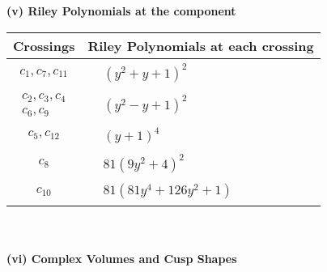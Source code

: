 \documentclass[1p]{elsarticle_modified}
\theoremstyle{definition}
\begin{document}
\newpage\renewcommand{\arraystretch}{1}
\flushleft \textbf{(v) Riley Polynomials at the component}\newline \\
\begin{tabular}{m{50pt}|m{274pt}}
Crossings & \hspace{64pt}Riley Polynomials at each crossing \\
\hline $$\begin{aligned}c_{1},c_{7},c_{11}\end{aligned}$$&$\begin{aligned}
&(y^2+y+1)^2
\end{aligned}$\\
\hline $$\begin{aligned}c_{2},c_{3},c_{4}\\c_{6},c_{9}\end{aligned}$$&$\begin{aligned}
&(y^2- y+1)^2
\end{aligned}$\\
\hline $$\begin{aligned}c_{5},c_{12}\end{aligned}$$&$\begin{aligned}
&(y+1)^4
\end{aligned}$\\
\hline $$\begin{aligned}c_{8}\end{aligned}$$&$\begin{aligned}
&81(9 y^2+4)^2
\end{aligned}$\\
\hline $$\begin{aligned}c_{10}\end{aligned}$$&$\begin{aligned}
&81(81 y^4+126 y^2+1)
\end{aligned}$\\
\hline
\end{tabular}\\~\\
\newpage\flushleft \textbf{(vi) Complex Volumes and Cusp Shapes}
\end{document}
